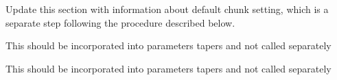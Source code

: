 \begin{DoxyRefList}
\item[Module \mbox{\hyperlink{a00921}{advanced\+Topics\+\_\+parameter\+Updates\+\_\+sequences}} ]\label{a00878__todo000002}%
%
Update this section with information about default chunk setting, which is a separate step following the procedure described below. 
\item[Member \mbox{\hyperlink{a00470_a596d5ea393d43f6f798a838aefe3cecd}{DBTo\+Gain}} (double dB)]\label{a00878__todo000016}%
%
This should be incorporated into parameters\textquotesingle{} tapers and not called separately  
\item[Member \mbox{\hyperlink{a00470_a76f29f12e35c093e5c198b8d0e27b6f9}{Gain\+To\+DB}} (double a\+Gain)]\label{a00878__todo000015}%
%
This should be incorporated into parameters\textquotesingle{} tapers and not called separately 
\end{DoxyRefList}